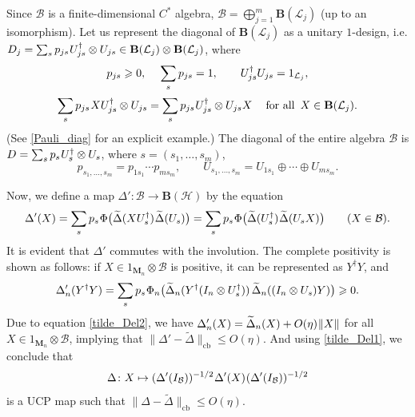 \documentclass[12pt]{article}
\newcommand{\calB}{\mathcal{B}}
\newcommand{\calH}{\mathcal{H}}
\newcommand{\calL}{\mathcal{L}}
\newcommand{\ts}{\mkern1mu}
\newcommand{\cb}{\mathrm{cb}}
\newcommand{\Bo}{\mathbf{B}}
\newcommand{\wt}{\widetilde}
\newcommand*{\Ma}[1]{\mathbf{M}_{#1}}
\renewcommand{\le}{\leqslant}
\renewcommand{\ge}{\geqslant}
\newtheorem[definition]{Definition}[Theorem]{Definition}
\newtheorem[remark]{Example}[Theorem]{Example}
\newtheorem[remark]{Remark}[Theorem]{Remark}
\newtheorem[remark]{Question}[Theorem]{Open question}
\newtheorem*[definition]{definition}{Definition}
\newtheorem*[remark]{example}{Example}
\newtheorem*[remark]{remark}{Remark}
\newtheorem*[remark]{question}{Open question}
\numberwithin{equation}{section}
\begin{document}
Since $\calB$ is a finite-dimensional $C^*$ algebra, $\calB=\bigoplus_{j=1}^{m}\Bo(\calL_j)$ (up to an isomorphism). Let us represent the diagonal of $\Bo(\calL_j)$ as a unitary $1$-design, i.e. $D_j=\sum_{s}p_{js}\ts U_{js}^\dag\otimes U_{js}\in\Bo(\calL_j)\otimes\Bo(\calL_j)$, where
\begin{gather}
\label{diag_j01}
p_{js}\ge 0,\quad\: \sum_{s}p_{js}=1,\qquad U_{js}^{\dag}U_{js}=1_{\calL_j},\\[2pt]
\label{diag_j2}
\sum_{s}p_{js}\ts XU_{js}^{\dag}\otimes U_{js}
=\sum_{s}p_{js}\ts U_{js}^{\dag}\otimes U_{js}X\quad\:
\text{for all }\, X\in\Bo(\calL_j).
\end{gather}
(See \eqref{Pauli_diag} for an explicit example.) The diagonal of the entire algebra $\calB$ is $D=\sum_{s}p_{s}\ts U_{s}^\dag\otimes U_{s}$, where $s=(s_1,\dots,s_m)$,
\begin{equation}
p_{s_1,\dots,s_m}=p_{1s_1}\cdots p_{ms_m},\qquad
U_{s_1,\dots,s_m}=U_{1s_1}\oplus\cdots\oplus U_{ms_m}.
\end{equation}

Now, we define a map $\Delta'\colon\calB\to\Bo(\calH)$ by the equation
\begin{equation}
\Delta'(X)=\sum_{s}p_{s}\ts\Phi\bigl(\wt{\Delta}(XU_{s}^{\dag})\ts\wt{\Delta}(U_{s})\bigr)
=\sum_{s}p_{s}\ts\Phi\bigl(\wt{\Delta}(U_{s}^{\dag})\ts\wt{\Delta}(U_{s}X)\bigr)\qquad (X\in\calB).
\end{equation}
It is evident that $\Delta'$ commutes with the involution. The complete positivity is shown as follows: if $X\in 1_{\Ma{n}}\otimes\calB$ is positive, it can be represented as $Y^{\dag}Y$, and
\[
\Delta'_n(Y^{\dag}Y)
=\sum_{s}p_{s}\ts\Phi_n\bigl(\wt{\Delta}_n(Y^{\dag}(I_n\otimes U_{s}^{\dag}))\,
\wt{\Delta}_n((I_n\otimes U_{s})Y)\bigr)\ge 0.
\]
Due to equation \eqref{tilde_Del2}, we have $\Delta'_n(X)=\wt{\Delta}_n(X)+O(\eta)\ts\|X\|$ for all $X\in 1_{\Ma{n}}\otimes\calB$, implying that $\|\Delta'-\wt{\Delta}\|_\cb\le O(\eta)$. And using \eqref{tilde_Del1}, we conclude that
\begin{equation}
\Delta\colon X\mapsto (\Delta'(I_\calB))^{-1/2}\ts\Delta'(X)\ts(\Delta'(I_\calB))^{-1/2}
\end{equation}
is a UCP map such that $\|\Delta-\wt{\Delta}\|_\cb\le O(\eta)$.
\end{document}
